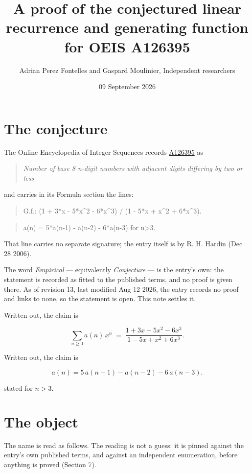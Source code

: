 \documentclass[11pt]{article}
\title{A proof of the conjectured linear recurrence and generating function for OEIS A126395}
\author{Adrian Perez Fontelles and Gaspard Moulinier, Independent researchers}
\date{09 September 2026}
\theoremstyle{definition}
\begin{document}
\maketitle
\section{The conjecture}

The Online Encyclopedia of Integer Sequences records \href{https://oeis.org/A126395}{A126395} as

\begin{quote}\itshape Number of base 8 n-digit numbers with adjacent digits differing by two or less\end{quote}

and carries in its Formula section the lines:

\begin{quote}\ttfamily G.f.: (1 + 3*x - 5*x\textasciicircum{}2 - 6*x\textasciicircum{}3) / (1 - 5*x + x\textasciicircum{}2 + 6*x\textasciicircum{}3).\end{quote}

\begin{quote}\ttfamily a(n) = 5*a(n-1) - a(n-2) - 6*a(n-3) for n>3.\end{quote}

That line carries no separate signature; the entry itself is by R. H. Hardin (Dec 28 2006).

The word {\itshape Empirical} --- equivalently {\itshape Conjecture} --- is the entry's own: the statement is recorded as fitted to the published terms, and no proof is given there. As of revision 13, last modified Aug 12 2026, the entry records no proof and links to none, so the statement is open. This note settles it.

Written out, the claim is

\[\sum_{n \ge 0} a(n)\,x^n \;=\; \frac{1 + 3x - 5x^{2} - 6x^{3}}{1 - 5x + x^{2} + 6x^{3}}.\]

Written out, the claim is

\[a(n) = 5\,a(n-1) - a(n-2) - 6\,a(n-3).\]

stated for $n > 3$.

\section{The object}

The name is read as follows. The reading is not a guess: it is pinned against the entry's own published terms, and against an independent enumeration, before anything is proved (Section 7).
\end{document}
